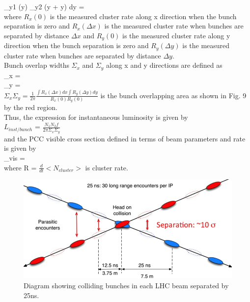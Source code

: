 \int \rho_{y1} (y) \rho_{y2} (y + \Delta y) dy =  \\

where $R_x(0)$ is the measured cluster rate along x direction when the bunch separation is zero and $R_x(\Delta x)$ is the measured cluster rate when bunches are separated by distance $\Delta x$ and $R_y(0)$ is the measured cluster rate along y direction when the bunch separation is zero and $R_y(\Delta y)$ is the measured cluster rate when bunches are separated by distance $\Delta y$. \\

Bunch overlap widths $\Sigma_x$ and $\Sigma_y$ along x and y directions are defined as \\

\Sigma_x =   \\

\Sigma_y =    \\

$\Sigma_x \Sigma_y = \frac{1}{2 \pi} \frac{\int R_x(\Delta x)dx \int R_y(\Delta y) dy}{R_x(0) R_y(0)}$  is the bunch overlapping area as shown in Fig. 9 by the red region.\\

Thus, the expression for instantaneous luminosity is given by \\

$L_{inst/bunch}$ = $\frac{N_1 N_2 f}{2\pi \Sigma_x \Sigma_y}$ \\

and the PCC visible cross section defined in terms of beam parameters and rate is given by \\

\sigma_{vis} =  \\

where R = $\frac{d}{dt} <N_{cluster}>$  is cluster rate.\\

\begin{figure}[H]
  \centering
  \includegraphics[width=0.6\columnwidth]{./LHCReport_1_image_cut.png}
  \caption{ \onehalfspacing Diagram showing colliding bunches in each LHC beam separated by 25ns.}
  \label{fig:CMS}
\end{figure}




